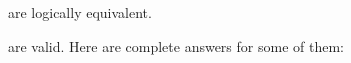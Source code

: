 \noSeq
\nextSeq
\nextSeq
\noSeq
\lastSeq
are logically equivalent.

\noSeq%
\nextSeq%
\noSeq%
\nextSeq%
\nextSeq%
\noSeq%
\nextSeq%
\noSeq%
\noSeq%
\lastSeq%
are valid. Here are complete answers for some of them:
